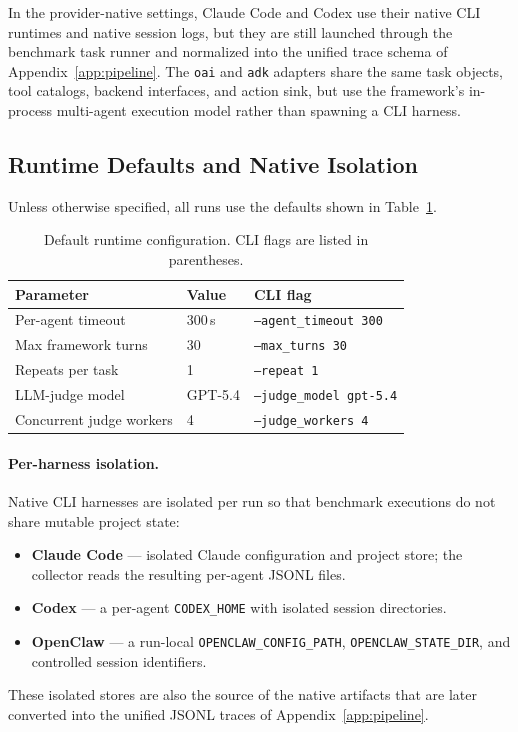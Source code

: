In the provider-native settings, Claude Code and Codex use their native
CLI runtimes and native session logs, but they are still launched through
the benchmark task runner and normalized into the unified trace schema of
Appendix~\ref{app:pipeline}. The \texttt{oai} and \texttt{adk}
adapters share the same task objects, tool catalogs, backend interfaces,
and action sink, but use the framework's in-process multi-agent execution
model rather than spawning a CLI harness.

\subsection{Runtime Defaults and Native Isolation}
\label{app:exp-setup:runtime}

Unless otherwise specified, all runs use the defaults shown in
Table~\ref{tab:runtime_defaults}.

\begin{table}[h]
\centering
\small
\setlength{\tabcolsep}{8pt}
\renewcommand{\arraystretch}{1.2}
\caption{Default runtime configuration. CLI flags are listed in
parentheses.}
\label{tab:runtime_defaults}
\begin{tabular}{@{}lll@{}}
\toprule
\textbf{Parameter} & \textbf{Value} & \textbf{CLI flag} \\
\midrule
Per-agent timeout         & 300\,s   & \texttt{--agent\_timeout 300}   \\
Max framework turns       & 30       & \texttt{--max\_turns 30}        \\
Repeats per task          & 1        & \texttt{--repeat 1}             \\
LLM-judge model           & GPT-5.4  & \texttt{--judge\_model gpt-5.4} \\
Concurrent judge workers  & 4        & \texttt{--judge\_workers 4}     \\
\bottomrule
\end{tabular}
\end{table}

\paragraph{Per-harness isolation.}
Native CLI harnesses are isolated per run so that benchmark executions do
not share mutable project state:
\begin{itemize}[leftmargin=1.2em, itemsep=2pt]
  \item \textbf{Claude Code} --- isolated Claude configuration and project
  store; the collector reads the resulting per-agent JSONL files.
  \item \textbf{Codex} --- a per-agent \texttt{CODEX\_HOME} with isolated
  session directories.
  \item \textbf{OpenClaw} --- a run-local \texttt{OPENCLAW\_CONFIG\_PATH},
  \texttt{OPENCLAW\_STATE\_DIR}, and controlled session identifiers.
\end{itemize}
These isolated stores are also the source of the native artifacts that are
later converted into the unified JSONL traces of
Appendix~\ref{app:pipeline}.

